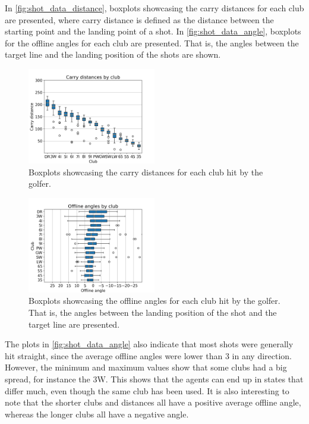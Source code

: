\documentclass{kththesis}
\begin{document}
In \autoref{fig:shot_data_distance}, boxplots showcasing the carry distances for each club are presented, where carry distance is defined as the distance between the starting point and the landing point of a shot. In \autoref{fig:shot_data_angle}, boxplots for the offline angles for each club are presented. That is, the angles between the target line and the landing position of the shots are shown.

\begin{figure}
    \centering
    \includegraphics[width=0.5\textwidth]{Boxplots/distances.png}
    \caption{Boxplots showcasing the carry distances for each club hit by the golfer.}
    \label{fig:shot_data_distance}
\end{figure}

\begin{figure}
    \centering
    \includegraphics[width=0.5\textwidth]{Boxplots/directions.png}
    \caption{Boxplots showcasing the offline angles for each club hit by the golfer. That is, the angles between the landing position of the shot and the target line are presented.}
    \label{fig:shot_data_angle}
\end{figure}

The plots in \autoref{fig:shot_data_angle} also indicate that most shots were generally hit straight, since the average offline angles were lower than 3 in any direction. However, the minimum and maximum values show that some clubs had a big spread, for instance the 3W. This shows that the agents can end up in states that differ much, even though the same club has been used. It is also interesting to note that the shorter clubs and distances all have a positive average offline angle, whereas the longer clubs all have a negative angle.
\end{document}
